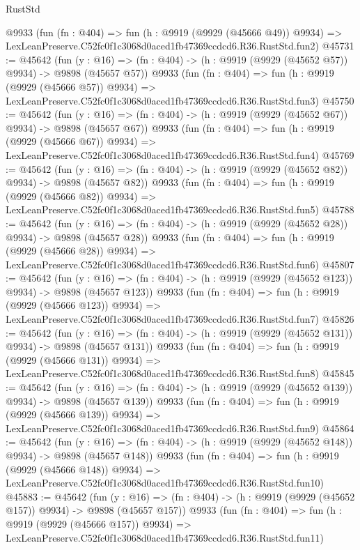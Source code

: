 \begin{lexlean}{RustStd}
\begin{coremodule}
    @9933
    (fun (fn : @404) =>
    fun (h : @9919 (@9929 (@45666 @49)) @9934) =>
    LexLeanPreserve.C52fc0f1c3068d0aced1fb47369ccdcd6.R36.RustStd.fun2)
@45731 := @45642
    (fun (y : @16) => (fn : @404) -> (h : @9919 (@9929 (@45652 @57)) @9934) -> @9898 (@45657 @57))
    @9933
    (fun (fn : @404) =>
    fun (h : @9919 (@9929 (@45666 @57)) @9934) =>
    LexLeanPreserve.C52fc0f1c3068d0aced1fb47369ccdcd6.R36.RustStd.fun3)
@45750 := @45642
    (fun (y : @16) => (fn : @404) -> (h : @9919 (@9929 (@45652 @67)) @9934) -> @9898 (@45657 @67))
    @9933
    (fun (fn : @404) =>
    fun (h : @9919 (@9929 (@45666 @67)) @9934) =>
    LexLeanPreserve.C52fc0f1c3068d0aced1fb47369ccdcd6.R36.RustStd.fun4)
@45769 := @45642
    (fun (y : @16) => (fn : @404) -> (h : @9919 (@9929 (@45652 @82)) @9934) -> @9898 (@45657 @82))
    @9933
    (fun (fn : @404) =>
    fun (h : @9919 (@9929 (@45666 @82)) @9934) =>
    LexLeanPreserve.C52fc0f1c3068d0aced1fb47369ccdcd6.R36.RustStd.fun5)
@45788 := @45642
    (fun (y : @16) => (fn : @404) -> (h : @9919 (@9929 (@45652 @28)) @9934) -> @9898 (@45657 @28))
    @9933
    (fun (fn : @404) =>
    fun (h : @9919 (@9929 (@45666 @28)) @9934) =>
    LexLeanPreserve.C52fc0f1c3068d0aced1fb47369ccdcd6.R36.RustStd.fun6)
@45807 := @45642
    (fun (y : @16) => (fn : @404) -> (h : @9919 (@9929 (@45652 @123)) @9934) -> @9898 (@45657 @123))
    @9933
    (fun (fn : @404) =>
    fun (h : @9919 (@9929 (@45666 @123)) @9934) =>
    LexLeanPreserve.C52fc0f1c3068d0aced1fb47369ccdcd6.R36.RustStd.fun7)
@45826 := @45642
    (fun (y : @16) => (fn : @404) -> (h : @9919 (@9929 (@45652 @131)) @9934) -> @9898 (@45657 @131))
    @9933
    (fun (fn : @404) =>
    fun (h : @9919 (@9929 (@45666 @131)) @9934) =>
    LexLeanPreserve.C52fc0f1c3068d0aced1fb47369ccdcd6.R36.RustStd.fun8)
@45845 := @45642
    (fun (y : @16) => (fn : @404) -> (h : @9919 (@9929 (@45652 @139)) @9934) -> @9898 (@45657 @139))
    @9933
    (fun (fn : @404) =>
    fun (h : @9919 (@9929 (@45666 @139)) @9934) =>
    LexLeanPreserve.C52fc0f1c3068d0aced1fb47369ccdcd6.R36.RustStd.fun9)
@45864 := @45642
    (fun (y : @16) => (fn : @404) -> (h : @9919 (@9929 (@45652 @148)) @9934) -> @9898 (@45657 @148))
    @9933
    (fun (fn : @404) =>
    fun (h : @9919 (@9929 (@45666 @148)) @9934) =>
    LexLeanPreserve.C52fc0f1c3068d0aced1fb47369ccdcd6.R36.RustStd.fun10)
@45883 := @45642
    (fun (y : @16) => (fn : @404) -> (h : @9919 (@9929 (@45652 @157)) @9934) -> @9898 (@45657 @157))
    @9933
    (fun (fn : @404) =>
    fun (h : @9919 (@9929 (@45666 @157)) @9934) =>
    LexLeanPreserve.C52fc0f1c3068d0aced1fb47369ccdcd6.R36.RustStd.fun11)

\end{coremodule}
\end{lexlean}
